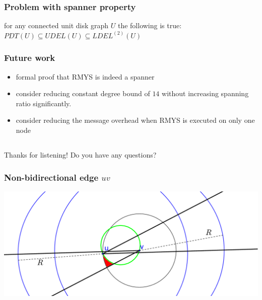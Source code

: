 \documentclass[compress]{beamer}
\begin{document}
\begin{frame}
\frametitle{Problem with spanner property}
\center for any connected unit disk graph $U $ the following is true:
\center $PDT(U) \subseteq UDEL(U) \subseteq LDEL^{(2)}(U) $
\end{frame}

\begin{frame}
\frametitle{Future work}
\begin{itemize}
\item formal proof that RMYS is indeed a spanner
\item consider reducing constant degree bound of $14 $ without increasing spanning ratio significantly.
\item consider reducing the message overhead when RMYS is executed on only one node
\end{itemize}
\end{frame}

\subsection{}
\begin{frame}
\center \Large Thanks for listening!
\center Do you have any questions?
\end{frame}


\begin{frame}
	\frametitle{Non-bidirectional edge $uv$}
	\center \includegraphics[width=1\linewidth]{RMYS_case_error_bidirectional.eps}
\end{frame}
\end{document}
